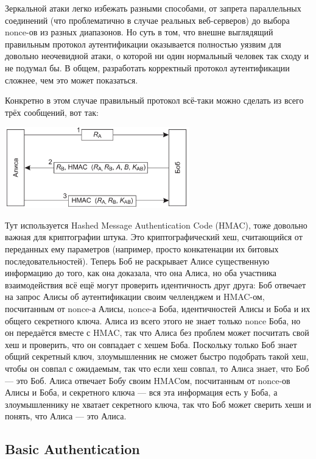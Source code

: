 \documentclass{../../text-style}
\begin{document}
Зеркальной атаки легко избежать разными способами, от запрета параллельных соединений (что проблематично в случае реальных веб-серверов) до выбора nonce-ов из разных диапазонов. Но суть в том, что внешне выглядящий правильным протокол аутентификации оказывается полностью уязвим для довольно неочевидной атаки, о которой ни один нормальный человек так сходу и не подумал бы. В общем, разработать корректный протокол аутентификации сложнее, чем это может показаться.

Конкретно в этом случае правильный протокол всё-таки можно сделать из всего трёх сообщений, вот так:

\begin{center}
    \includegraphics[width=0.6\textwidth]{hmacs.png}
\end{center}

Тут используется Hashed Message Authentication Code (HMAC), тоже довольно важная для криптографии штука. Это криптографический хеш, считающийся от переданных ему параметров (например, просто конкатенации их битовых последовательностей). Теперь Боб не раскрывает Алисе существенную информацию до того, как она доказала, что она Алиса, но оба участника взаимодействия всё ещё могут проверить идентичность друг друга: Боб отвечает на запрос Алисы об аутентификации своим челленджем и HMAC-ом, посчитанным от nonce-а Алисы, nonce-а Боба, идентичностей Алисы и Боба и их общего секретного ключа. Алиса из всего этого не знает только nonce Боба, но он передаётся вместе с HMAC, так что Алиса без проблем может посчитать свой хеш и проверить, что он совпадает с хешем Боба. Поскольку только Боб знает общий секретный ключ, злоумышленник не сможет быстро подобрать такой хеш, чтобы он совпал с ожидаемым, так что если хеш совпал, то Алиса знает, что Боб --- это Боб. Алиса отвечает Бобу своим HMACом, посчитанным от nonce-ов Алисы и Боба, и секретного ключа --- вся эта информация есть у Боба, а злоумышленнику не хватает секретного ключа, так что Боб может сверить хеши и понять, что Алиса --- это Алиса.

\subsection{Basic Authentication}
\end{document}
